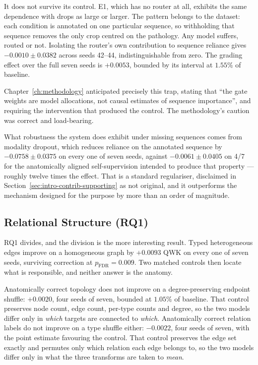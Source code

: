 \documentclass[12pt,a4paper]{report}
\begin{document}
It does not survive its control. E1, which has no router at all, exhibits the
same dependence with drops as large or larger. The pattern belongs to the
dataset: each condition is annotated on one particular sequence, so withholding
that sequence removes the only crop centred on the pathology. Any model suffers,
routed or not. Isolating the router's own contribution to sequence reliance
gives $-0.0010 \pm 0.0382$ across seeds 42--44, indistinguishable from zero.
The grading effect over the full seven seeds is $+0.0053$, bounded by its
interval at $1.55\%$ of baseline.

Chapter~\ref{ch:methodology} anticipated precisely this trap, stating that
\enquote{the gate weights are model allocations, not causal estimates of
sequence importance}, and requiring the intervention that produced the control.
The methodology's caution was correct and load-bearing.

What robustness the system does exhibit under missing sequences comes from
modality dropout, which reduces reliance on the annotated sequence by
$-0.0758 \pm 0.0375$ on every one of seven seeds, against $-0.0061 \pm 0.0405$
on 4/7 for the anatomically aligned self-supervision intended to produce that
property --- roughly twelve times the effect. That is a standard regulariser,
disclaimed in Section~\ref{sec:intro-contrib-supporting} as not original, and it
outperforms the mechanism designed for the purpose by more than an order of
magnitude.

\subsection{Relational Structure (RQ1)}

RQ1 divides, and the division is the more interesting result. Typed
heterogeneous edges improve on a homogeneous graph by $+0.0093$ QWK on every one
of seven seeds, surviving correction at $p_{\mathrm{FDR}} = 0.009$. Two matched
controls then locate what is responsible, and neither answer is the anatomy.

Anatomically correct topology does not improve on a degree-preserving endpoint
shuffle: $+0.0020$, four seeds of seven, bounded at $1.05\%$ of baseline. That
control preserves node count, edge count, per-type counts and degree, so the two
models differ only in \emph{which} targets are connected to \emph{which}.
Anatomically correct relation labels do not improve on a type shuffle either:
$-0.0022$, four seeds of seven, with the point estimate favouring the control.
That control preserves the edge set exactly and permutes only which relation
each edge belongs to, so the two models differ only in what the three transforms
are taken to \emph{mean}.
\end{document}
